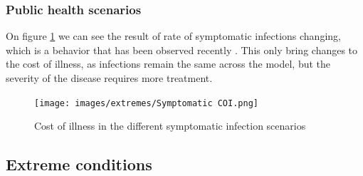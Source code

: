 \subsubsection{Public health scenarios}

On figure \ref{fig:symptom_COI} we can see the result of rate of symptomatic infections changing, which is a behavior that has been observed recently \parencite{medema_assessment_1996}. This only bring changes to the cost of illness, as infections remain the same across the model, but the severity of the disease requires more treatment.

\begin{figure}[h!]
    \centering
    \texttt{[image: images/extremes/Symptomatic COI.png]} 
    \caption{Cost of illness in the different symptomatic infection scenarios}
    \label{fig:symptom_COI}
\end{figure}

\subsection{Extreme conditions}
\label{s:extreme_conditions}

